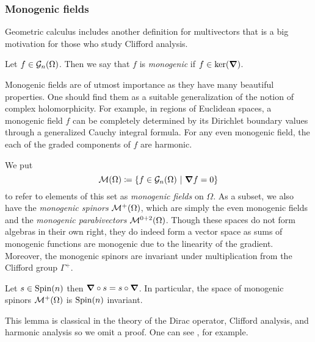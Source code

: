 \subsubsection{Monogenic fields}

Geometric calculus includes another definition for multivectors that is a big motivation for those who study Clifford analysis. 
\begin{definition}
 Let $f \in \mathcal{G}_n(\Omega)$. Then we say that $f$ is \emph{monogenic} if $f \in \ker(\boldsymbol{\nabla})$.
\end{definition}

Monogenic fields are of utmost importance as they have many beautiful properties. One should find them as a suitable generalization of the notion of complex holomorphicity. For example, in regions of Euclidean spaces, a monogenic field $f$ can be completely determined by its Dirichlet boundary values through a generalized Cauchy integral formula. For any even monogenic field, the each of the graded components of $f$ are harmonic.  

We put 
\[
\mathcal{M}(\Omega) \coloneqq \{f \in \mathcal{G}_n(\Omega) ~\vert~ \boldsymbol{\nabla} f =0\}
\]
to refer to elements of this set as \emph{monogenic fields} on $\Omega$. As a subset, we also have the \emph{monogenic spinors} $\mathcal{M}^+(\Omega)$, which are simply the even monogenic fields and the \emph{monogenic parabivectors} $\mathcal{M}^{0+2}(\Omega)$. Though these spaces do not form algebras in their own right, they do indeed form a vector space as sums of monogenic functions are monogenic due to the linearity of the gradient.  Moreover, the monogenic spinors are invariant under multiplication from the Clifford group $\Gamma^+$.

\begin{lemma}
\label{lem:clifford_invariant}
Let $s\in \operatorname{Spin}(n)$ then $\boldsymbol{\nabla} \circ s = s \circ \boldsymbol{\nabla}$.  In particular, the space of monogenic spinors $\mathcal{M}^+(\Omega)$ is $\operatorname{Spin}(n)$ invariant.
\end{lemma}
This lemma is classical in the theory of the Dirac operator, Clifford analysis, and harmonic analysis so we omit a proof.  One can see \cite{janssens_special_nodate}, for example.

